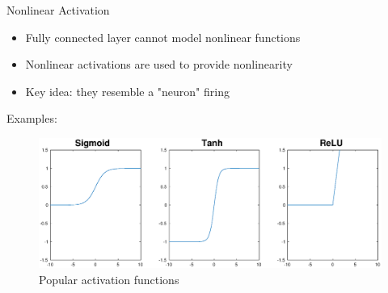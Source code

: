 \documentclass{beamer}
\begin{document}
\begin{frame}{Nonlinear Activation}
    \begin{itemize}
        \item Fully connected layer cannot model nonlinear functions
        \item Nonlinear activations are used to provide nonlinearity
        \item Key idea: they resemble a "neuron" firing
    \end{itemize}
    Examples:   
    \vspace{-15pt}
    \begin{figure}
        \hspace*{-2cm}
        \includegraphics[width=1.33\textwidth]{activations}
        \caption*{Popular activation functions}
    \end{figure}

\end{frame}
\end{document}

